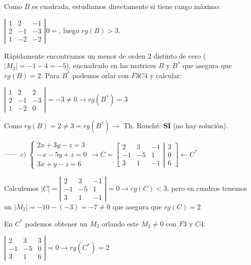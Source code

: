 \begin{proofw}
 Como $B$ es cuadrada, estudiamos directamente si tiene rango máximo:
 
 $\left| \begin{matrix}   
\boxed{1}&\boxed{2}&-1\\\boxed{2}&\boxed{-1}&-3\\1&-2&-2   \end{matrix} \right| 0=$, luego $rg(B)>3$. 

Rápidamente encontramos un menor de orden $2$ distinto de cero ($|M_2|=-1-4=-5$), encuadrado en las matrices $B$ y $B^*$ que asegura que $rg(B)=2$. Para $B^*$ podemos orlar con $F3C4$ y calcular: 

$\left| \begin{matrix}
 1&2&2\\2&-1&-3\\1&-2&0	
 \end{matrix} \right|=-3\neq 0 \to rg(B^*)=3$
 
 Como $rg(B)=2\neq 3=rg(B^*) \to $ Th. Rouché: \textbf{SI} (no hay solución).


	



------ $c) \; \begin{cases} 2x+3y-z=3\\-x-5y+z=0\\3x+y-z=6  \end{cases}  \to C=\left[ \begin{matrix}   2&3&-1\\-1&-5&1\\3&1&-1
\end{matrix} \right| \left. \begin{matrix} 
 3\\0\\6	
 \end{matrix} \right] \leftarrow C^*$

Calculemos $|C|=\left| \begin{matrix}   \boxed{2}&\boxed{3}&-1\\\boxed{-1}&\boxed{-5}&1\\3&1&-1
\end{matrix} \right|=  0 \to rg(C)<3$, pero en cuadros tenemos un $|M_2|=-10-(-3)=-7\neq 0$ que asegura que $rg(C)=2$

En $C^*$ podemos obtener un $M_3$ orlando este $M_2\neq 0$ con $F3$ y $C4$:

$\left| \begin{matrix} 2&3&3\\-1&-5&0\\3&1&6 \end{matrix} \right| =0 \to rg(C^*)=2$


\end{proofw}
